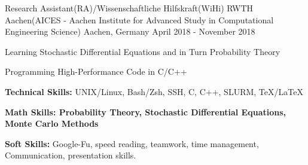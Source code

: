 \begin{cventries}
  \cventry
  {Research Assistant(RA)/Wissenschaftliche Hilfskraft(WiHi)} %
  {RWTH Aachen(AICES - Aachen Institute for Advanced Study in Computational Engineering Science)} %
  {Aachen, Germany} %
  {April 2018 - November 2018} %
  {
    \begin{cvitems} %
      \item {Learning Stochastic Differential Equations and in Turn Probability Theory} 
      \item {Programming High-Performance Code in C/C++}
      \item {\textbf{Technical Skills:} UNIX/Linux, Bash/Zsh, SSH, C, C++, SLURM, \TeX/\LaTeX}
      \item {\textbf{Math Skills: Probability Theory, Stochastic Differential Equations, Monte Carlo Methods}}
      \item {\textbf{Soft Skills:} Google-Fu, speed reading, teamwork, time management, Communication, presentation skills.}
    \end{cvitems}
  }\\


\end{cventries}
